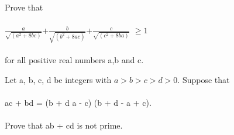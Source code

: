 

\item Prove that\\
\\ $\frac{a}{\sqrt{(a^2 + 8bc)}}$+$\frac{b}{\sqrt{(b^2 + 8ac)}}$+$\frac{c}{\sqrt{(c^2 + 8ba)}}$ $\geq 1$\\
\\ for all positive real numbers a,b and c.\\

\item Let a, b, c, d be integers with $a > b > c > d > 0$. Suppose that\\
\\ ac + bd = (b + d  a - c) (b + d - a + c).\\
\\ Prove that ab + cd is not prime.



